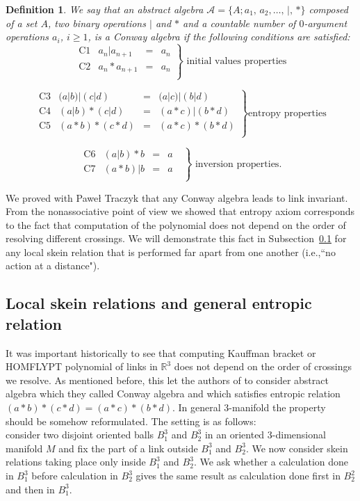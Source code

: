 \documentclass[12pt]{amsart}
\newtheorem{definition}[theorem]{Definition}
\begin{document}
\begin{definition}\label{ConwayAlgebra} We say that an abstract algebra 
$\mathcal A= \{A; a_1,\,a_2,\ldots,\, |,\, * \}$ composed of a set $A$, two binary operations $|$ and $*$ and a countable number of $0$-argument operations $a_i$, $i\geq 1$, is a Conway algebra if the following conditions are satisfied:
$$
\left.
\begin{array}{llll}
\mbox{C1} & a_n| a_{n+1} &=& a_n\\
\mbox{C2} & a_n \ast a_{n+1}& =& a_n\\
\end{array}
\right\} 
\mbox{ initial values properties}
$$

$$
\left.
\begin{array}{llll}
\mbox{C3} & (a| b)| (c| d)&=&(a|
c)|(b| d) \\
\mbox{C4} &(a| b)\ast(c| d)&=&(a\ast
c)|(b\ast d) \\
\mbox{C5} &(a\ast b)\ast(c\ast d)&=&(a\ast c)\ast(b\ast d) \\
\end{array}
\right\} 
\mbox{entropy properties}
$$

$$
\left.
\begin{array}{llll}
\mbox{C6} &(a| b)\ast b &=& a\mbox{\ \ \ \ \ \ \ } \\
\mbox{C7} &(a\ast b)| b &=& a \\
\end{array}  
\right\} 
\mbox{ inversion properties.}
$$
\end{definition}
We proved with Pawe{\l} Traczyk that any Conway algebra leads to link invariant. From the nonassociative point of view we showed that entropy axiom corresponds to the fact that computation of the polynomial does not depend on the order of resolving different crossings. We will demonstrate this fact in Subsection~\ref{skein-entropic} for any local skein relation that is performed far apart from one another (i.e.,``no action at a distance").

\subsection{Local skein relations and general entropic relation}\label{skein-entropic}

It was important historically to see that computing Kauffman bracket or HOMFLYPT 
polynomial of links in $\mathbb R^3$ does not depend on the order of crossings we resolve. As mentioned before, this let the authors of \cite{PT1} to consider abstract algebra which they called Conway algebra and which satisfies entropic relation $(a*b)*(c*d)=(a*c)*(b*d)$.
In general 3-manifold the property should be somehow reformulated.
The setting is as follows: \\
consider two disjoint oriented balls $B_1^3$ and $B_2^3$ in an oriented 3-dimensional manifold $M$ and fix the part of a link outside  $B_1^3$ and $B_2^3$.
We now consider skein relations taking place only inside $B_1^3$  and $B_2^3$.
We ask whether a calculation done in $B_1^3$ before calculation in $B_2^3$ gives the same result as calculation done first in $B_2^2$ and then in $B_1^3$. 
\end{document}
